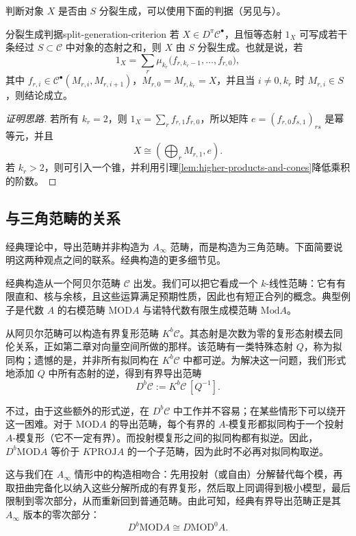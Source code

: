 判断对象 $X$ 是否由 $S$ 分裂生成，可以使用下面的判据（另见与）。
\begin{lemma}{分裂生成判据}{split-generation-criterion}
若 $X\in D^\pi\mathcal C^\bullet$，且恒等态射 $1_X$ 可写成若干条经过 $S\subset\mathcal C$ 中对象的态射之和，则 $X$ 由 $S$ 分裂生成。也就是说，若
\[
  1_X=\sum_r \mu_{k_r}\bigl(f_{r,k_r-1},\ldots,f_{r,0}\bigr),
\]
其中 $f_{r,i}\in\mathcal C^\bullet(M_{r,i},M_{r,i+1})$，$M_{r,0}=M_{r,k_r}=X$，并且当 $i\ne0,k_r$ 时 $M_{r,i}\in S$，则结论成立。
\end{lemma}
\begin{proof}[证明思路]
若所有 $k_r=2$，则 $1_X=\sum_r f_{r,1}f_{r,0}$，所以矩阵 $e=(f_{r,0}f_{s,1})_{rs}$ 是幂等元，并且
\[
  X\cong\left(\bigoplus_r M_{r,1},e\right).
\]
若 $k_r>2$，则可引入一个锥，并利用引理\ref{lem:higher-products-and-cones}降低乘积的阶数。
\end{proof}

\subsection{与三角范畴的关系}\label{subsec:triangulated-categories}
经典理论中，导出范畴并非构造为 $A_\infty$ 范畴，而是构造为三角范畴。下面简要说明这两种观点之间的联系。经典构造的更多细节见。

经典构造从一个阿贝尔范畴 $\mathcal C$ 出发。我们可以把它看成一个 $k$-线性范畴：它有有限直和、核与余核，且这些运算满足预期性质，因此也有短正合列的概念。典型例子是代数 $A$ 的右模范畴 $\mathrm{MOD}A$ 与诺特代数有限生成模范畴 $\mathrm{Mod}A$。

从阿贝尔范畴可以构造有界复形范畴 $K^b\mathcal C$。其态射是次数为零的复形态射模去同伦关系，正如第二章对向量空间所做的那样。该范畴有一类特殊态射 $Q$，称为拟同构；遗憾的是，并非所有拟同构在 $K^b\mathcal C$ 中都可逆。为解决这一问题，我们形式地添加 $Q$ 中所有态射的逆，得到有界导出范畴
\[
  D^b\mathcal C:=K^b\mathcal C\,[Q^{-1}].
\]

不过，由于这些额外的形式逆，在 $D^b\mathcal C$ 中工作并不容易；在某些情形下可以绕开这一困难。对于 $\mathrm{MOD}A$ 的导出范畴，每个有界的 $A$-模复形都拟同构于一个投射 $A$-模复形（它不一定有界）。而投射模复形之间的拟同构都有拟逆。因此，$D^b\mathrm{MOD}A$ 等价于 $K\mathrm{PROJ}A$ 的一个子范畴，因为此时不必再对拟同构取逆。

这与我们在 $A_\infty$ 情形中的构造相吻合：先用投射（或自由）分解替代每个模，再取扭曲完备化以纳入这些分解所成的有界复形，然后取上同调得到极小模型，最后限制到零次部分，从而重新回到普通范畴。由此可知，经典有界导出范畴正是其 $A_\infty$ 版本的零次部分：
\[
  D^b\mathrm{MOD}A\cong D\mathrm{MOD}^{0}A.
\]

